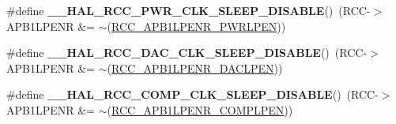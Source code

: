 \begin{DoxyCompactItemize}
\item 
\hypertarget{group___r_c_c___peripheral___clock___sleep___enable___disable_ga7b9889044ebfe2c9328d0f6733fda87d}{\#define {\bfseries \-\_\-\-\_\-\-H\-A\-L\-\_\-\-R\-C\-C\-\_\-\-P\-W\-R\-\_\-\-C\-L\-K\-\_\-\-S\-L\-E\-E\-P\-\_\-\-D\-I\-S\-A\-B\-L\-E}()~(R\-C\-C-\/$>$A\-P\-B1\-L\-P\-E\-N\-R \&= $\sim$(\hyperlink{group___peripheral___registers___bits___definition_ga274fa282ad1ff40b747644bf9360feb4}{R\-C\-C\-\_\-\-A\-P\-B1\-L\-P\-E\-N\-R\-\_\-\-P\-W\-R\-L\-P\-E\-N}))}\label{group___r_c_c___peripheral___clock___sleep___enable___disable_ga7b9889044ebfe2c9328d0f6733fda87d}

\item 
\hypertarget{group___r_c_c___peripheral___clock___sleep___enable___disable_gab24893ba4a827492272e611d2756d928}{\#define {\bfseries \-\_\-\-\_\-\-H\-A\-L\-\_\-\-R\-C\-C\-\_\-\-D\-A\-C\-\_\-\-C\-L\-K\-\_\-\-S\-L\-E\-E\-P\-\_\-\-D\-I\-S\-A\-B\-L\-E}()~(R\-C\-C-\/$>$A\-P\-B1\-L\-P\-E\-N\-R \&= $\sim$(\hyperlink{group___peripheral___registers___bits___definition_gaf36a11e89644548702385d548f3f9ec4}{R\-C\-C\-\_\-\-A\-P\-B1\-L\-P\-E\-N\-R\-\_\-\-D\-A\-C\-L\-P\-E\-N}))}\label{group___r_c_c___peripheral___clock___sleep___enable___disable_gab24893ba4a827492272e611d2756d928}

\item 
\hypertarget{group___r_c_c___peripheral___clock___sleep___enable___disable_ga0a2842c49b58e3205331133db69ec8f2}{\#define {\bfseries \-\_\-\-\_\-\-H\-A\-L\-\_\-\-R\-C\-C\-\_\-\-C\-O\-M\-P\-\_\-\-C\-L\-K\-\_\-\-S\-L\-E\-E\-P\-\_\-\-D\-I\-S\-A\-B\-L\-E}()~(R\-C\-C-\/$>$A\-P\-B1\-L\-P\-E\-N\-R \&= $\sim$(\hyperlink{group___peripheral___registers___bits___definition_gae6751f8c4511c642d6086b356f325a63}{R\-C\-C\-\_\-\-A\-P\-B1\-L\-P\-E\-N\-R\-\_\-\-C\-O\-M\-P\-L\-P\-E\-N}))}\label{group___r_c_c___peripheral___clock___sleep___enable___disable_ga0a2842c49b58e3205331133db69ec8f2}


\end{DoxyCompactItemize}
